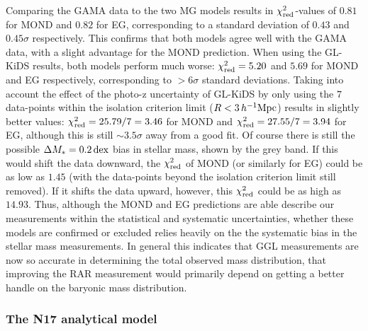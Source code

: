 \documentclass[usenatbib]{mnras}
\newcommand{\hMpc}{\, h^{-1}{\rm{Mpc}} }
\newcommand{\un}[1]{_{\rm #1}}
\newcommand{\dex}{\, {\rm dex}}
\begin{document}
Comparing the GAMA data to the two MG models results in $\chi\un{red}^2$-values of $0.81$ for MOND and $0.82$ for EG, corresponding to a standard deviation of $0.43$ and $0.45 \sigma$ respectively. This confirms that both models agree well with the GAMA data, with a slight advantage for the MOND prediction. When using the GL-KiDS results, both models perform much worse: $\chi\un{red}^2=5.20$ and $5.69$ for MOND and EG respectively, corresponding to $>6 \sigma$ standard deviations. Taking into account the effect of the photo-z uncertainty of GL-KiDS by only using the $7$ data-points within the isolation criterion limit ($R < 3 \hMpc$) results in slightly better values: $\chi\un{red}^2 = 25.79/7 = 3.46$ for MOND and $\chi\un{red}^2 = 27.55/7 = 3.94$ for EG, although this is still $\sim3.5 \sigma$ away from a good fit. Of course there is still the possible $\Delta M_* = 0.2 \dex$ bias in stellar mass, shown by the grey band. If this would shift the data downward, the $\chi\un{red}^2$ of MOND (or similarly for EG) could be as low as $1.45$ (with the data-points beyond the isolation criterion limit still removed). If it shifts the data upward, however, this $\chi\un{red}^2$ could be as high as $14.93$. Thus, although the MOND and EG predictions are able describe our measurements within the statistical and systematic uncertainties, whether these models are confirmed or excluded relies heavily on the the systematic bias in the stellar mass measurements. In general this indicates that GGL measurements are now so accurate in determining the total observed mass distribution, that improving the RAR measurement would primarily depend on getting a better handle on the baryonic mass distribution.

\subsubsection{The N17 analytical model}
\end{document}
